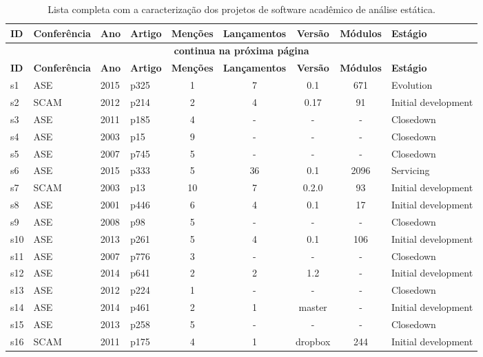 \begin{longtable}{| l | l | l | l | c | c | c | c | l |}
  \caption{Lista completa com a caracterização dos projetos de software acadêmico de análise estática.}
  \label{dataset-table} \\
  \hline
  \endfirsthead
  \hline
  \textbf{ID} & \textbf{Conferência} & \textbf{Ano} & \textbf{Artigo} & \textbf{Menções} & \textbf{Lançamentos} & \textbf{Versão} & \textbf{Módulos} & \textbf{Estágio} \\
  \hline
  \endhead
  \multicolumn{9}{c}{\textbf{continua na próxima página}} \\
  \hhline{---------} \endfoot
  \endlastfoot
  \textbf{ID} & \textbf{Conferência} & \textbf{Ano} & \textbf{Artigo} & \textbf{Menções} & \textbf{Lançamentos} & \textbf{Versão} & \textbf{Módulos} & \textbf{Estágio} \\
  \hline
s1 & ASE & 2015 & p325 & 1 & 7 & 0.1 & 671 & Evolution \\
    \hline
s2 & SCAM & 2012 & p214 & 2 & 4 & 0.17 & 91 & Initial development \\
    \hline
s3 & ASE & 2011 & p185 & 4 & - & - & - & Closedown \\
    \hline
s4 & ASE & 2003 & p15 & 9 & - & - & - & Closedown \\
    \hline
s5 & ASE & 2007 & p745 & 5 & - & - & - & Closedown \\
    \hline
s6 & ASE & 2015 & p333 & 5 & 36 & 0.1 & 2096 & Servicing \\
    \hline
s7 & SCAM & 2003 & p13 & 10 & 7 & 0.2.0 & 93 & Initial development \\
    \hline
s8 & ASE & 2001 & p446 & 6 & 4 & 0.1 & 17 & Initial development \\
    \hline
s9 & ASE & 2008 & p98 & 5 & - & - & - & Closedown \\
    \hline
s10 & ASE & 2013 & p261 & 5 & 4 & 0.1 & 106 & Initial development \\
    \hline
s11 & ASE & 2007 & p776 & 3 & - & - & - & Closedown \\
    \hline
s12 & ASE & 2014 & p641 & 2 & 2 & 1.2 & - & Initial development \\
    \hline
s13 & ASE & 2012 & p224 & 1 & - & - & - & Closedown \\
    \hline
s14 & ASE & 2014 & p461 & 2 & 1 & master & - & Initial development \\
    \hline
s15 & ASE & 2013 & p258 & 5 & - & - & - & Closedown \\
    \hline
s16 & SCAM & 2011 & p175 & 4 & 1 & dropbox & 244 & Initial development \\

\end{longtable}
